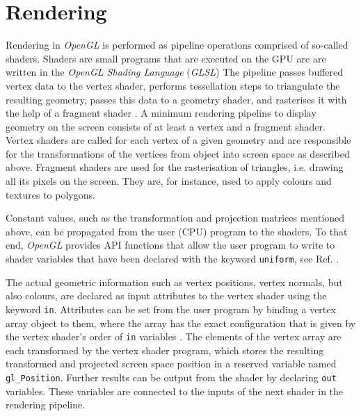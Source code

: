 \section{Rendering}
\label{sec:gl_shaders}
Rendering in \textit{OpenGL} is performed as pipeline operations comprised of so-called shaders.
Shaders are small programs that are executed on the GPU are are written in the
\textit{OpenGL Shading Language} (\textit{GLSL}) \cite{wiki_glsl}
The pipeline passes buffered vertex data to the vertex shader, performs tessellation steps to triangulate
the resulting geometry, passes this data to a geometry shader, and rasterises it with the help
of a fragment shader \cite[p. 6]{Sellers2002}.
A minimum rendering pipeline to display geometry on the screen consists of at least a vertex and
a fragment shader.
Vertex shaders are called for each vertex of a given geometry and are responsible for the transformations
of the vertices from object into screen space as described above.
Fragment shaders are used for the rasterisation of triangles, i.e. drawing all its pixels on the screen. 
They are, for instance, used to apply colours and textures to polygons.

Constant values, such as the transformation and projection matrices mentioned above, can be propagated from the 
user (CPU) program to the shaders. To that end, \textit{OpenGL} provides API functions that allow the user 
program to write to shader variables that have been declared with the keyword \lstinline[language=C]|uniform|,
see Ref. \cite[pp. 103-126]{Sellers2002}.

The actual geometric information such as vertex positions, vertex normals, but also colours, are declared as
input attributes to the vertex shader using the keyword \lstinline[language=C]|in|.
Attributes can be set from the user program by binding a vertex array object to them,
where the array has the exact configuration that is given by the vertex shader's order of \lstinline[language=C]|in|
variables \cite[pp. 97-102]{Sellers2002}.
The elements of the vertex array are each transformed by the vertex shader program, which stores the resulting 
transformed and projected screen space position in a reserved variable named \lstinline[language=C]|gl_Position|.
Further results can be output from the shader by declaring \lstinline[language=C]|out| variables.
These variables are connected to the inputs of the next shader in the rendering pipeline.

